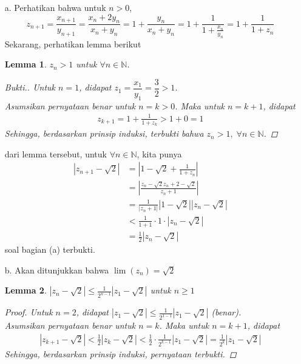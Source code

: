 \documentclass{article}
\renewcommand{\qed}{\unskip\nobreak\quad\qedsymbol}%
\theoremstyle{indented}
\newtheorem*{lemma}{Lemma}
\begin{document}
	\begin{enumerate}
		\item[a.] Perhatikan bahwa untuk $n>0$,
		$$
		z_{n+1} = \frac{x_{n+1}}{y_{n+1}} 
		= \frac{x_n +  2y_n}{x_n+y_n} 
		= 1 + \frac{y_n}{x_n+y_n} 
		= 1 + \frac{1}{1+\frac{x_n}{y_n}} 
		= 1 + \frac{1}{1 + z_n}$$
		Sekarang, perhatikan lemma berikut
		 
		 \begin{lemma} $z_n > 1$ untuk $\forall n \in \mathbb{N}$.
		 		
		 		\begin{proof}[Bukti.]
		 			Untuk $n=1$, didapat $z_1 = \dfrac{x_1}{y_1} = \dfrac{3}{2} > 1$.\\
		 			Asumsikan pernyataan benar untuk $n=k > 0$. Maka untuk $n = k+1$, didapat 
		 			\begin{align*}
		 				z_{k+1}
		 				= 1 + \frac{1}{1 + z_k}
		 				> 1 + 0 = 1
		 			\end{align*}
		 			Sehingga, berdasarkan prinsip induksi, terbukti bahwa $z_n > 1, \; \forall n \in \mathbb{N}$.
		 		\end{proof}
		 		
		 	\end{lemma}
		 
		
		dari lemma tersebut, untuk $\forall n \in \mathbb{N}$, kita punya
		\begin{align*}
			\left|z_{n+1} - \sqrt{2}\right| 
			&= \left|1 - \sqrt{2} + \frac{1}{1+z_n}\right|  \\
			&= \left|\frac{z_n-\sqrt{2}z_n+2-\sqrt{2}}{z_n+1}\right| \\
			&= \frac{1}{\left|z_n+1\right|}\left|1-\sqrt{2}\right|\left|z_n-\sqrt{2}\right| \\
			&< \frac{1}{1+1}\cdot1\cdot\left|z_n-\sqrt{2}\right| \\
			&= \frac12\left|z_n-\sqrt{2}\right|
		\end{align*}
	soal bagian (a) terbukti. \qed
	\newpage
	\item[b.] Akan ditunjukkan bahwa $\lim (z_n) = \sqrt{2}$
	\begin{lemma}
		$\left|z_{n} - \sqrt{2}\right| \le \frac{1}{2^{n-1}}\left|z_1-\sqrt{2}\right|$ untuk $n \ge 1$
		\begin{proof}
			Untuk $n=2$, didapat $\left|z_{1} - \sqrt{2}\right|
			\le \frac{1}{2^{1-1}}\left|z_1-\sqrt{2}\right|$ (benar).\\
			Asumsikan pernyataan benar untuk $n=k$. Maka untuk $n = k+1$, didapat 
			\begin{align*}
				\left|z_{k+1} - \sqrt{2}\right|
				< \frac12\left|z_k-\sqrt{2}\right| <\frac12 \cdot \frac{1}{2^{k-1}}\left|z_1-\sqrt{2}\right| = \frac{1}{2^{k}}\left|z_1-\sqrt{2}\right|
			\end{align*}
			Sehingga, berdasarkan prinsip induksi, pernyataan terbukti.
		\end{proof}
	\end{lemma}
	

\end{enumerate}
\end{document}
